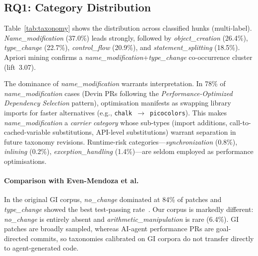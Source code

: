 \documentclass[runningheads]{llncs}
\begin{document}
%

\subsection{RQ1: Category Distribution}
\label{subsec:distribution}

Table~\ref{tab:taxonomy} shows the distribution across classified hunks
(multi-label). \emph{Name\_modification} (37.0\%) leads strongly, followed
by \emph{object\_creation} (26.4\%), \emph{type\_change} (22.7\%),
\emph{control\_flow} (20.9\%), and \emph{statement\_splitting} (18.5\%).
Apriori mining confirms a
\emph{name\_modification}+\emph{type\_change} co-occurrence cluster
(lift~3.07).

The dominance of \emph{name\_modification} warrants interpretation. In 78\%
of \emph{name\_modification} cases (Devin PRs following the
\emph{Performance-Optimized Dependency Selection} pattern), optimisation
manifests as swapping library imports for faster alternatives
(e.g., \texttt{chalk}~$\rightarrow$~\texttt{picocolors}). This makes
\emph{name\_modification} a \emph{carrier category} whose sub-types
(import additions, call-to-cached-variable substitutions, API-level
substitutions) warrant separation in future taxonomy revisions.
Runtime-risk categories---\emph{synchronization} (0.8\%),
\emph{inlining} (0.2\%), \emph{exception\_handling} (1.4\%)---are
seldom employed as performance optimisations.

\paragraph{Comparison with Even-Mendoza et al.}
In the original GI corpus, \emph{no\_change} dominated at 84\% of patches
and \emph{type\_change} showed the best test-passing
rate~\cite{evenmendoza2025}. Our corpus is markedly different:
\emph{no\_change} is entirely absent and \emph{arithmetic\_manipulation}
is rare (6.4\%). GI patches are broadly sampled, whereas AI-agent
performance PRs are goal-directed commits, so taxonomies calibrated on GI
corpora do not transfer directly to agent-generated code.
\end{document}
